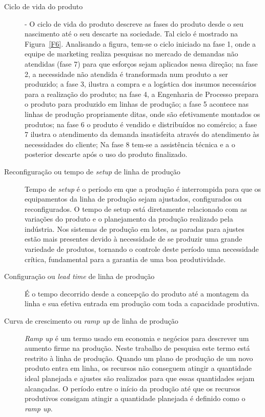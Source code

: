 \begin{description}
	\item[Ciclo de vida do produto] -
	O ciclo de vida do produto descreve as fases do produto desde o seu nascimento até o seu descarte na sociedade. Tal ciclo é mostrado na Figura~\ref{F6}. Analisando a figura, tem-se o ciclo iniciado na fase 1, onde a equipe de marketing realiza pesquisas no mercado de demandas não atendidas (fase 7) para que esforços sejam aplicados nessa direção; na fase 2, a necessidade não atendida é transformada num produto a ser produzido; a fase 3, ilustra a compra e a logística dos insumos necessários para a realização do produto; na fase 4, a Engenharia de Processo prepara o produto para produzido em linhas de produção; a fase 5 acontece nas linhas de produção propriamente ditas, onde são efetivamente montados os produtos; na fase 6 o produto é vendido e distribuídos no comércio; a fase 7 ilustra o atendimento da demanda insatisfeita através do atendimento às necessidades do cliente; Na fase 8 tem-se a assistência técnica e a o posterior descarte após o uso do produto finalizado.
	
	\item[Reconfiguração ou tempo de \textit{setup} de linha de produção]
	Tempo de \textit{setup} é o período em que a produção é interrompida para que os equipamentos da linha de produção sejam ajustados, configurados ou reconfigurados. O tempo de setup está diretamente relacionado com as variações do produto e o planejamento da produção realizado pela indústria.
	Nos sistemas de produção em lotes, as paradas para ajustes estão mais presentes devido à necessidade de se produzir uma grande variedade de produtos, tornando o controle deste período uma necessidade crítica, fundamental para a garantia de uma boa produtividade. 
	
	\item[Configuração ou \textit{lead time} de linha de produção]
	É o tempo decorrido desde a concepção do produto até a montagem da linha e sua efetiva entrada em produção com toda a capacidade produtiva.
	
	\item[Curva de crescimento ou \textit{ramp up} de linha de produção]
	\textit{Ramp up} é um termo usado em economia e negócios para descrever um aumento firme na produção. Neste trabalho de pesquisa este termo está restrito à linha de produção.  Quando um plano de produção de um novo produto entra em linha, os recursos não conseguem atingir a quantidade ideal planejada e ajustes são realizados para que essas quantidades sejam alcançadas. O período entre o início da produção até que os recursos produtivos consigam atingir a quantidade planejada é definido como o \textit{ramp up}.
\end{description}

